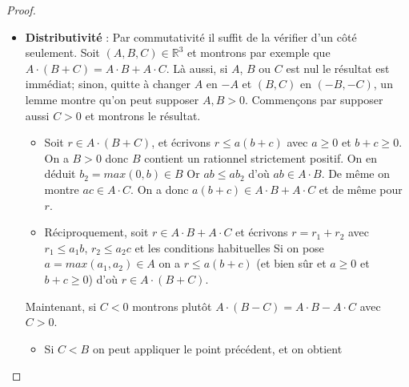 \documentclass[french]{book}
\theoremstyle{plain}
\theoremstyle{definition}
\theoremstyle{remark}
\begin{document}
\begin{proof}
\begin{itemize}
\begin{itemize}
\begin{itemize}
				\item[*]Réciproquement soit $c \in A_1$, et montrons que $c \in A \cdot B$. Si $c \leqslant 0$ il suffit de remarquer que $0 \in A \cap B$, donc considérons à de maintenant que $c > 0$. Supposons que pour tout $a > 0$ dans $A$, on ait $\frac{a}{c} \in A$. Si nous choisissons $a_0 > 0$ fixé dans $A$ (ce qui est possible par un lemme précédent), une récurrence immédiate montre qu'on aurait $\displaystyle\frac{a_0}{c^n} \in A$ pour tout $n \in \mathbb{N}$. Or si on prend $x \in \mathbb{Q} \backslash A$, on peut trouver $n \in \mathbb{N}$ tel que $\displaystyle (\frac{1}{c})^n > \frac{x}{a_0}$ un lemme. On en déduirait $x < \frac{a_0}{c^n}$ et finalement $x \in A$ contradiction.	Donc il existe $a > 0$ dans $A$ tel que $\displaystyle b' = \frac{a}{c} \notin A$. Si on pose $\displaystyle b= \frac{1}{b'} \in B$, on obtient alors $c = ab \in A \cdot B$.
			\end{itemize}
		\end{itemize}
		\item \textbf{Distributivité} : Par commutativité il suffit de la vérifier d'un côté seulement. Soit $(A,B,C) \in \mathbb{R}^3$ et montrons par exemple que $A \cdot (B+C) = A \cdot B + A \cdot C$. Là aussi, si $A$, $B$ ou $C$ est nul le résultat est immédiat; sinon, quitte à changer $A$ en $-A$ et $(B,C)$ en $(-B,-C)$, un lemme montre qu'on peut supposer $A, B > 0$. Commençons par supposer aussi $C > 0$ et montrons le résultat.
		\begin{itemize}
			\item[--] Soit $r \in A \cdot (B+C)$, et écrivons $r \leqslant a(b+c)$ avec $a \geqslant 0$ et $b+c \geqslant 0$. On a $B > 0$ donc $B$ contient un rationnel strictement positif. On en déduit $b_{2} = max(0,b) \in B$ Or $ab \leqslant ab_{2}$ d'où $ab \in A \cdot B$. De même on montre $ac \in A \cdot C$. On a donc $a(b+c) \in A \cdot B + A \cdot C$ et de même pour $r$.
			\item[--]Réciproquement, soit $r \in A \cdot B + A \cdot C$ et écrivons $r = r_{1} + r_{2}$ avec $r_{1} \leqslant a_{1}b$, $r_{2} \leqslant a_{2}c$ et les conditions habituelles Si on pose $a = max(a_{1},a_{2}) \in A$ on a $r \leqslant a(b+c)$ (et bien sûr et $a \geqslant 0$ et $b+c \geqslant 0$) d'où $r \in A \cdot (B+C)$.		
		\end{itemize}
		Maintenant, si $C < 0$ montrons plutôt $A \cdot (B-C) = A \cdot B - A \cdot C$ avec  $C > 0$.
		\begin{itemize}
			\item[--]Si $C < B$ on peut appliquer le point précédent, et on obtient

\end{itemize}
\end{itemize}
\end{proof}
\end{document}
